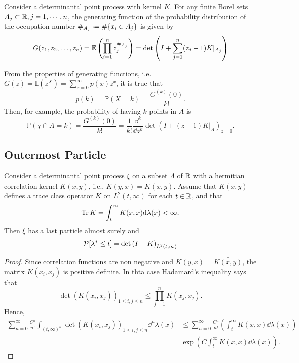 \begin{thm} \cite{ManuelaGirottiPhD}
	Consider a determinantal point process with kernel $K$. For any finite Borel sets $A_j \subset \mathbb{R}, j = 1, \cdots, n$, the generating function of the probability distribution of the occupation number $\#_{A_j} \deff \# \{x_i \in A_j\}$ is given by
	\begin{equation}
		G(z_1, z_2, \dots, z_n) = \mathbb{E} \left( \prod_{i=1}^{n} z_j^{\#_{A_j}} \right) = \det \left( I + \sum_{j=1}^n (z_j - 1) K|_{A_j} \right)
	\end{equation}
\end{thm}

From the properties of generating functions, i.e. $G(z) = \mathbb{E}(z^X) = \sum_{x=0}^\infty p(x) z^x$, it is true that
\begin{equation}
	p(k) = \mathbb{P}(X = k) = \frac{G^{(k)}(0)}{k!}.
\end{equation}
 Then, for example,  the probability of having $k$ points in $A$ is
 \begin{equation}
 	\mathbb{P}(\chi \cap A = k) = \frac{G^{(k)}(0)}{k!} = \frac{1}{k!} \frac{\dd^k}{\dd z^k} \det \left( I + (z-1) K|_A\right)_{z=0}.
 \end{equation}
 
\subsection{Outermost Particle}

\begin{prop}
	Consider a determinantal point process $\xi$ on a subset $\Lambda$  of $\mathbb{R}$ with a hermitian correlation kernel $K(x,y)$, i.e., $K(y,x)  = \bar{K(x, y)}$. Assume that $K(x,y)$ defines a trace class operator $K$ on $L^2(t, \infty)$ for each $t \in \mathbb{R}$, and that
	\begin{equation}
		\operatorname{Tr} K = \int_t^\infty K(x,x) \mathrm{d} \lambda (x) < \infty.
	\end{equation}
	Then $\xi$ has a last particle almost surely and 
	\begin{equation}
		\mathcal{P}[\lambda^* \leq t] = \det{(I - K)}_{L^2(t, \infty)}
	\end{equation}
\end{prop}
\begin{proof}
	Since correlation functions are non negative and $K(y,x)  = \bar{K(x, y)}$, the matrix $K(x_i, x_j)$ is positive definite. In thta case Hadamard's inequality says that 
	\begin{equation}
		\det\left( K(x_i, x_j) \right)_{1 \leq i, j \leq n} \leq \prod_{j=1}^{n} K(x_j, x_j).
	\end{equation}
	Hence,
	\begin{align}
		\sum_{n=0}^\infty \frac{C^n}{n!} \int_{(t, \infty)^n} \det(K(x_i, x_j))_{1 \leq i, j \leq n} \dd^n \lambda(x)& \leq \sum_{n=0}^{\infty} \frac{C^n}{n!} \left( \int_t^\infty K(x,x) \dd \lambda(x) \right) \\
		& \exp{\left(C \int_t^\infty K(x,x) \dd \lambda(x) \right)}.
	\end{align}
\end{proof}
	
